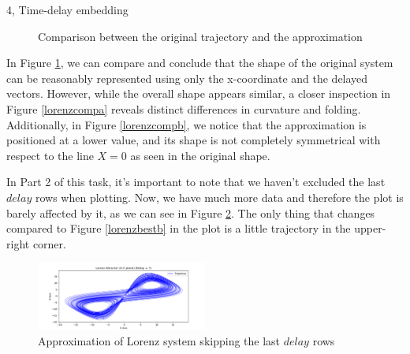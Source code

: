\begin{task}{4, Time-delay embedding}
\begin{figure}[H]
\centering
{}
\caption{Comparison between the original trajectory and the approximation}
\label{lorenzcomp}
\end{figure}

In Figure \ref{lorenzcomp}, we can compare and conclude that the shape of the original system can be reasonably represented using only the x-coordinate and the delayed vectors. However, while the overall shape appears similar, a closer inspection in Figure \ref{lorenzcompa} reveals distinct differences in curvature and folding. Additionally, in Figure \ref{lorenzcompb}, we notice that the approximation is positioned at a lower value, and its shape is not completely symmetrical with respect to the line \(X=0\) as seen in the original shape. 

In Part 2 of this task, it's important to note that we haven't excluded the last \(delay\) rows when plotting. Now, we have much more data and therefore the plot is barely affected by it, as we can see in Figure \ref{lorenzskip}. The only thing that changes compared to Figure \ref{lorenzbestb} in the plot is a little trajectory in the upper-right corner.
\begin{figure}[H]
\centering
\includegraphics[width=0.5\textwidth]{images/trajectory_lorentz_xz_skip.png}
\caption{Approximation of Lorenz system skipping the last \(delay\) rows}
\label{lorenzskip}
\end{figure}




\end{task}
